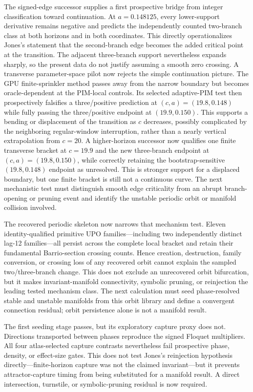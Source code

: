 The signed-edge successor supplies a first prospective bridge from integer
classification toward continuation.  At $a=0.148125$, every lower-support
derivative remains negative and predicts the independently counted two-branch
class at both horizons and in both coordinates.  This directly operationalizes
Jones's statement that the second-branch edge becomes the added critical point
at the transition.  The adjacent three-branch support nevertheless expands
sharply, so the present data do not justify assuming a smooth zero crossing.
A transverse parameter-space pilot now rejects the simple continuation picture.
The GPU finite-sprinkler method passes away from the narrow boundary but becomes
oracle-dependent at the PIM-local controls.  Its selected adaptive-PIM test
then prospectively falsifies a three/positive prediction at
$(c,a)=(19.8,0.148)$ while fully passing the three/positive endpoint at
$(19.9,0.150)$.  This supports a bending or displacement of the transition as
$c$ decreases, possibly complicated by the neighboring regular-window
interruption, rather than a nearly vertical extrapolation from $c=20$.  A
higher-horizon successor now qualifies one finite transverse bracket at
$c=19.9$ and the new three-branch endpoint at $(c,a)=(19.8,0.150)$, while
correctly retaining the bootstrap-sensitive $(19.8,0.148)$ endpoint as
unresolved.  This is stronger support for a displaced boundary, but one
finite bracket is still not a continuous curve.  The next
mechanistic test must distinguish smooth edge criticality from an abrupt
branch-opening or pruning event and identify the unstable periodic orbit or
manifold collision involved.

The recovered periodic skeleton now narrows that mechanism test.  Eleven
identity-qualified primitive UPO families---including two independently
distinct lag-12 families---all persist across the complete local bracket and
retain their fundamental Barrio-section crossing counts.  Hence creation,
destruction, family conversion, or crossing loss of any recovered orbit cannot
explain the sampled two/three-branch change.  This does not exclude an
unrecovered orbit bifurcation, but it makes invariant-manifold connectivity,
symbolic pruning, or reinjection the leading tested mechanism class.  The next
calculation must seed phase-resolved stable and unstable manifolds from this
orbit library and define a convergent connection residual; orbit persistence
alone is not a manifold result.

The first seeding stage passes, but its exploratory capture proxy does not.
Directions transported between phases reproduce the signed Floquet
multipliers.  All four atlas-selected capture contrasts nevertheless fail
prospective phase, density, or effect-size gates.  This does not test Jones's
reinjection hypothesis directly---finite-horizon capture was not the claimed
invariant---but it prevents attractor-capture timing from being substituted
for a manifold result.  A direct intersection, turnstile, or symbolic-pruning
residual is now required.

